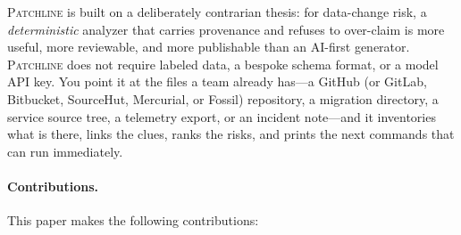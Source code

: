 \documentclass[11pt]{article}
\newcommand{\tool}{\textsc{Patchline}}
\begin{document}
\tool{} is built on a deliberately contrarian thesis: for data-change risk, a \emph{deterministic}
analyzer that carries provenance and refuses to over-claim is more useful, more reviewable, and more
publishable than an AI-first generator. \tool{} does not require labeled data, a bespoke schema
format, or a model API key. You point it at the files a team already has---a GitHub (or GitLab,
Bitbucket, SourceHut, Mercurial, or Fossil) repository, a migration directory, a service source
tree, a telemetry export, or an incident note---and it inventories what is there, links the clues,
ranks the risks, and prints the next commands that can run immediately.

\paragraph{Contributions.} This paper makes the following contributions:
\end{document}
